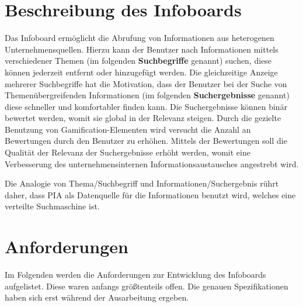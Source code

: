 \documentclass[12pt,twoside]{book}
\begin{document}
\section{Beschreibung des Infoboards}

Das Infoboard ermöglicht die Abrufung von Informationen aus heterogenen Unternehmensquellen. Hierzu kann der Benutzer nach Informationen mittels verschiedener Themen (im folgenden \textbf{Suchbegriffe} genannt) suchen, diese können jederzeit entfernt oder hinzugefügt werden. Die gleichzeitige Anzeige mehrerer Suchbegriffe hat die Motivation, dass der Benutzer bei der Suche von Themenübergreifenden Informationen (im folgenden \textbf{Suchergebnisse} genannt) diese schneller und komfortabler finden kann.
Die Suchergebnisse können binär bewertet werden, womit sie global in der Relevanz steigen.
Durch die gezielte Benutzung von Gamification-Elementen wird versucht die Anzahl an Bewertungen durch den Benutzer zu erhöhen.
Mittels der Bewertungen soll die Qualität der Relevanz der Suchergebnisse erhöht werden, womit eine Verbesserung des unternehmensinternen Informationsaustausches angestrebt wird.

Die Analogie von Thema/Suchbegriff und Informationen/Suchergebnis rührt daher, dass PIA als Datenquelle für die Informationen benutzt wird, welches eine verteilte Suchmaschine ist.


\section{Anforderungen}

Im Folgenden werden die Anforderungen zur Entwicklung des Infoboards aufgelistet. Diese waren anfangs größtenteils offen. Die genauen Spezifikationen haben sich erst während der Ausarbeitung ergeben.
\end{document}
